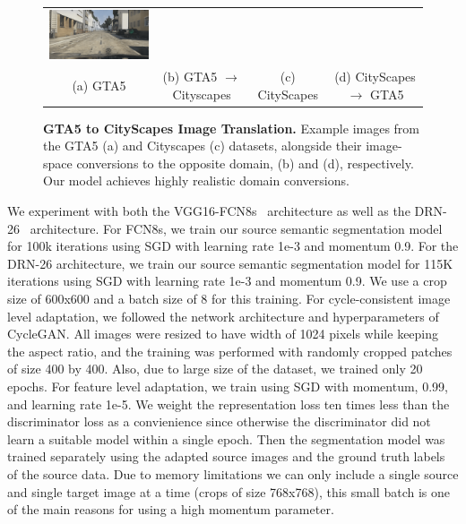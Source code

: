 \begin{figure}[h]
{\begin{tabular}{cc cc}
    \includegraphics[width=\myw, height=\myh]{figs/gta-cityscapes/fake-gta-02612-fs8.png}
   \\
   (a) GTA5 & (b) GTA5 $\rightarrow$ Cityscapes & (c) CityScapes & (d) CityScapes $\rightarrow$ GTA5
  \end{tabular}
  }
  \caption{%
  \textbf{GTA5 to CityScapes Image Translation.} Example images from the GTA5 (a) and Cityscapes (c) datasets, alongside their image-space conversions to the opposite domain, (b) and (d), respectively. Our model achieves highly realistic domain conversions.}
  \label{fig:gta-cityscapes-appendix}
\end{figure}

We experiment with both the VGG16-FCN8s~\cite{long_cvpr15} architecture as well as the DRN-26~\cite{drn} architecture. 
For FCN8s, we train our source semantic segmentation model for 100k iterations using SGD with learning rate 1e-3 and momentum 0.9.
For the DRN-26 architecture, we train our source semantic segmentation model for 115K iterations using SGD with learning rate 1e-3 and momentum 0.9. We use a crop size of 600x600 and a batch size of 8 for this training. 
For cycle-consistent image level adaptation, we followed the network architecture and hyperparameters of CycleGAN\citep{zhu_arxiv17}.
All images were resized to have width of 1024 pixels while keeping the aspect ratio, and the training was performed with randomly cropped patches of size 400 by 400. Also, due to large size of the dataset, we trained only 20 epochs.
For feature level adaptation, we train using SGD with momentum, 0.99, and learning rate 1e-5. We weight the representation loss ten times less than the discriminator loss as a convienience since otherwise the discriminator did not learn a suitable model within a single epoch. Then the segmentation model was trained separately using the adapted source images and the ground truth labels of the source data. Due to memory limitations we can only include a single source and single target image at a time (crops of size 768x768), this small batch is one of the main reasons for using a high momentum parameter.


